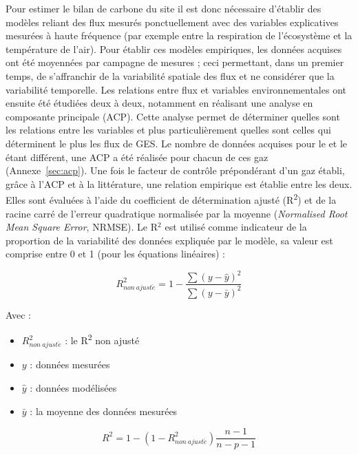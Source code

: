 Pour estimer le bilan de carbone du site il est donc nécessaire d'établir des modèles reliant des flux mesurés ponctuellement avec des variables explicatives mesurées à haute fréquence (par exemple entre la respiration de l'écosystème et la température de l'air).
Pour établir ces modèles empiriques, les données acquises ont été moyennées par campagne de mesures ; ceci permettant, dans un premier temps, de s'affranchir de la variabilité spatiale des flux et ne considérer que la variabilité temporelle.
Les relations entre flux et variables environnementales ont ensuite été étudiées deux à deux, notamment en réalisant une analyse en composante principale (ACP).
Cette analyse permet de déterminer quelles sont les relations entre les variables et plus particulièrement quelles sont celles qui déterminent le plus les flux de GES.
Le nombre de données acquises pour le \coo et le \chh étant différent, une ACP a été réalisée pour chacun de ces gaz (Annexe~\ref{sec:acp}).
Une fois le facteur de contrôle prépondérant d'un gaz établi, grâce à l'ACP et à la littérature, une relation empirique est établie entre les deux.
Elles sont évaluées à l'aide du coefficient de détermination ajusté (R\textsuperscript{2}) et de la racine carré de l'erreur quadratique normalisée par la moyenne (\textit{Normalised Root Mean Square Error}, NRMSE).
Le R$^{2}$ est utilisé comme indicateur de la proportion de la variabilité des données expliquée par le modèle, sa valeur est comprise entre 0 et 1 (pour les équations linéaires) : 

$$ R^{2}_{non~ajust\acute{e}} = 1 - \frac{\sum(y-\hat{y})^2}{\sum(y-\bar{y})^2} $$ 

Avec : 
\begin{itemize}
\item $R^{2}_{non~ajust\acute{e}}$ : le R\textsuperscript{2} non ajusté
\item $y$ : données mesurées
\item $\hat{y}$ : données modélisées
\item $\bar{y}$ : la moyenne des données mesurées
\end{itemize}

$$ R^{2} = 1 - (1-R^{2}_{non~ajust\acute{e}})\frac{n-1}{n-p-1} $$ 


